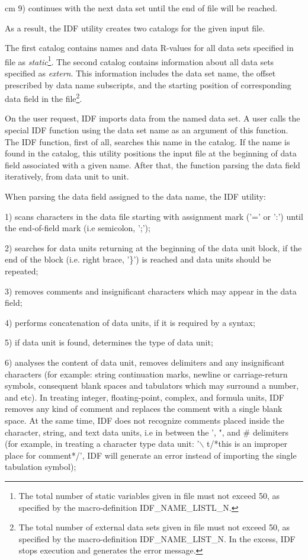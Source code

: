 { 
{ cm}
9) continues with the next data set until
the end of file will be reached.
}

As a result, the IDF utility creates two catalogs
for the given input file.

The first catalog contains  names and data R-values for
all data sets specified in file as {\it static}\footnote{
The total number of static variables given in file
must not exceed 50, as specified by the macro-definition
IDF\_NAME\_LISTL\_N.
}.
The second catalog contains information
about all data sets specified as {\it extern}.
This information includes the data set name, the
offset prescribed by data name subscripts,
and the starting position of corresponding data field 
in the file\footnote{
The total number of external data sets given in file
must not exceed 50, as specified by the macro-definition
IDF\_NAME\_LIST\_N.
In the excess, IDF stops execution and generates
the error message.
}.

On the user request, IDF imports data from the named data set.
A user calls the special IDF function using the data set name
as an argument of this function.
The IDF function, first of all, searches this name in the catalog.
If the name is found in the catalog, this utility positions the input file
at the beginning of data field associated with a given name.
After that, the function parsing the data field iteratively, 
from data unit to unit.

When parsing the data field assigned to the data name,
the IDF utility:

1) scans characters in the data file
starting with assignment mark ('=' or ':') 
until the end-of-field mark (i.e semicolon, ';');

2) searches for data units returning
at the beginning of the data unit block,
if the end of the block (i.e. right brace, '\}') is reached
and  data units should be repeated;

3) removes comments and insignificant characters
which may appear in the data field;

4) performs concatenation of data units, if it is required by a syntax;

5) if data unit is found, determines the type of data unit;

6) analyses the content of data unit,
removes delimiters and any insignificant
characters (for example:  string continuation marks, 
newline or carriage-return symbols, 
consequent blank spaces and tabulators which may surround a number,
and etc).
In treating  integer, floating-point, complex, and formula units,
IDF removes any kind of comment and replaces the comment
with a single blank space.
At the same time, IDF does not recognize comments placed inside the character,
string, and text data units, i.e in between the ', ", and \# delimiters
(for example, in treating a character type data unit:
'$\backslash$ t/*this is an improper place for comment*/',
IDF will generate an error instead of importing the single tabulation symbol);

